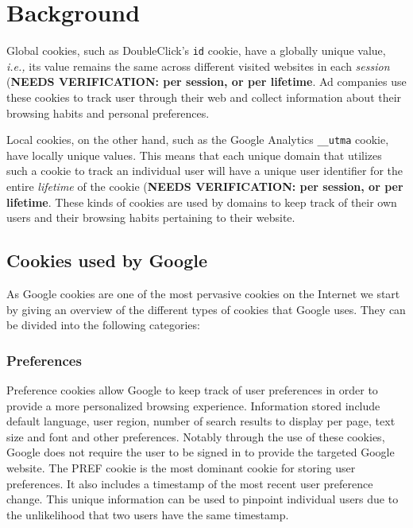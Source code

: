 \section{Background}
\label{sec:background}

Global cookies, such as DoubleClick's \texttt{id} cookie, have a globally unique value, \emph{i.e.,} its value remains the same across different visited websites in each \emph{session} (\textbf{NEEDS VERIFICATION: per session, or per lifetime}. 
Ad companies use these cookies to track user through their web and collect information about their browsing habits and personal preferences.

Local cookies, on the other hand, such as the Google Analytics \texttt{\_\_utma} cookie, have locally unique values.
This means that each unique domain that utilizes such a cookie to track an individual user will have a unique user identifier for the entire \emph{lifetime} of the cookie (\textbf{NEEDS VERIFICATION: per session, or per lifetime}.
These kinds of cookies are used by domains to keep track of their own users and their browsing habits pertaining to their website. 

\subsection{Cookies used by Google}
As Google cookies are one of the most pervasive cookies on the Internet we start by giving an overview of the different types of cookies that Google uses. They can be divided into the following categories:

\subsubsection{Preferences}
Preference cookies allow Google to keep track of user preferences in order to provide a more personalized browsing experience. Information stored include default language, user region, number of search results to display per page, text size and font and other preferences. Notably through the use of these cookies, Google does not require the user to be signed in to provide the targeted Google website. The PREF cookie is the most dominant cookie for storing user preferences. It also includes a timestamp of the most recent user preference change. This unique information can be used to pinpoint individual users due to the unlikelihood that two users have the same timestamp.

